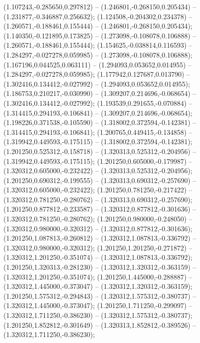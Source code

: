  (1.107243,-0.285650,0.297812) -- (1.246801,-0.268150,0.205434) -- (1.231877,-0.346887,0.256632);
 (1.124508,-0.204302,0.234378) -- (1.260571,-0.188461,0.155444) -- (1.246801,-0.268150,0.205434);
 (1.140350,-0.121895,0.173825) -- (1.273098,-0.108078,0.106888) -- (1.260571,-0.188461,0.155444);
 (1.154625,-0.038814,0.116593) -- (1.284297,-0.027278,0.059985) -- (1.273098,-0.108078,0.106888);
 (1.167196,0.044525,0.063111) -- (1.294093,0.053652,0.014955) -- (1.284297,-0.027278,0.059985);
 (1.177942,0.127687,0.013790) -- (1.302416,0.134412,-0.027992) -- (1.294093,0.053652,0.014955);
 (1.186753,0.210217,-0.030990) -- (1.309207,0.214696,-0.068654) -- (1.302416,0.134412,-0.027992);
 (1.193539,0.291655,-0.070884) -- (1.314415,0.294193,-0.106841) -- (1.309207,0.214696,-0.068654);
 (1.198226,0.371538,-0.105590) -- (1.318002,0.372594,-0.142381) -- (1.314415,0.294193,-0.106841);
 (1.200765,0.449415,-0.134858) -- (1.319942,0.449593,-0.175115) -- (1.318002,0.372594,-0.142381);
 (1.201250,0.525312,-0.158718) -- (1.320313,0.525312,-0.204956) -- (1.319942,0.449593,-0.175115);
 (1.201250,0.605000,-0.179987) -- (1.320312,0.605000,-0.232422) -- (1.320313,0.525312,-0.204956);
 (1.201250,0.690312,-0.199555) -- (1.320313,0.690312,-0.257690) -- (1.320312,0.605000,-0.232422);
 (1.201250,0.781250,-0.217422) -- (1.320312,0.781250,-0.280762) -- (1.320313,0.690312,-0.257690);
 (1.201250,0.877812,-0.233587) -- (1.320312,0.877812,-0.301636) -- (1.320312,0.781250,-0.280762);
 (1.201250,0.980000,-0.248050) -- (1.320312,0.980000,-0.320312) -- (1.320312,0.877812,-0.301636);
 (1.201250,1.087813,-0.260812) -- (1.320312,1.087813,-0.336792) -- (1.320312,0.980000,-0.320312);
 (1.201250,1.201250,-0.271872) -- (1.320312,1.201250,-0.351074) -- (1.320312,1.087813,-0.336792);
 (1.201250,1.320313,-0.281230) -- (1.320312,1.320312,-0.363159) -- (1.320312,1.201250,-0.351074);
 (1.201250,1.445000,-0.288887) -- (1.320312,1.445000,-0.373047) -- (1.320312,1.320312,-0.363159);
 (1.201250,1.575312,-0.294843) -- (1.320312,1.575312,-0.380737) -- (1.320312,1.445000,-0.373047);
 (1.201250,1.711250,-0.299097) -- (1.320312,1.711250,-0.386230) -- (1.320312,1.575312,-0.380737);
 (1.201250,1.852812,-0.301649) -- (1.320313,1.852812,-0.389526) -- (1.320312,1.711250,-0.386230);

